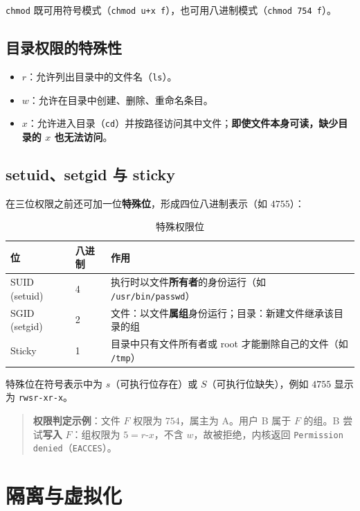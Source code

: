 \noindent \texttt{chmod} 既可用符号模式（\texttt{chmod u+x\,f}），也可用八进制模式（\texttt{chmod 754\,f}）。

\subsection{目录权限的特殊性}

\begin{itemize}
    \item $r$：允许列出目录中的文件名（\texttt{ls}）。
    \item $w$：允许在目录中创建、删除、重命名条目。
    \item $x$：允许进入目录（\texttt{cd}）并按路径访问其中文件；\textbf{即使文件本身可读，缺少目录的 $x$ 也无法访问}。
\end{itemize}

\subsection{setuid、setgid 与 sticky}

在三位权限之前还可加一位\textbf{特殊位}，形成四位八进制表示（如 $4755$）：

\begin{table}[H]
\centering
\caption{特殊权限位}
\begin{tabulary}{\textwidth}{LLL}
\toprule
位 & 八进制 & 作用 \\
\midrule
SUID (setuid) & 4 & 执行时以文件\textbf{所有者}的身份运行（如 \texttt{/usr/bin/passwd}） \\
SGID (setgid) & 2 & 文件：以文件\textbf{属组}身份运行；目录：新建文件继承该目录的组 \\
Sticky & 1 & 目录中只有文件所有者或 root 才能删除自己的文件（如 \texttt{/tmp}） \\
\bottomrule
\end{tabulary}
\end{table}

\noindent 特殊位在符号表示中为 $s$（可执行位存在）或 $S$（可执行位缺失），例如 $4755$ 显示为 \texttt{rwsr-xr-x}。

\begin{quote}
\textbf{权限判定示例}：文件 $F$ 权限为 $754$，属主为 A。用户 B 属于 $F$ 的组。B 尝试\textbf{写入} $F$：组权限为 $5 = r\text{-}x$，不含 $w$，故被拒绝，内核返回 \texttt{Permission denied}（\texttt{EACCES}）。
\end{quote}

\section{隔离与虚拟化}

